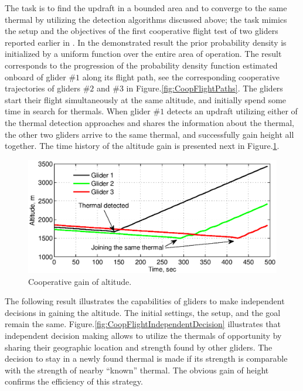\documentclass[letterpaper, 10 pt, conference]{ieeeconf}  %
\newcommand{\squeezeup}{\vspace{-1.0mm}}
\begin{document}
The task is to find the updraft in a bounded area and to converge to the same thermal by utilizing the detection algorithms discussed above; the task mimics the setup and the objectives of the first cooperative flight test of two gliders reported earlier in \cite{AKlass_JGCD:2012}. In the demonstrated
result the prior probability density is initialized by a uniform function over the entire area of operation. The result corresponds to the progression of the probability density function estimated onboard of glider $\#1$ along its flight path, see the corresponding cooperative trajectories of gliders
$\#2$ and $\#3$ in Figure.\ref{fig:CoopFlightPaths}. The gliders start their flight simultaneously at the same altitude, and initially spend some time in search for thermals. When glider $\#1$ detects an updraft utilizing either of the thermal detection approaches and shares the information about the thermal, the other two gliders arrive to the same thermal, and successfully gain height all together. The time history of the altitude gain is presented next in Figure.\ref{fig:CoopFlightHeight}.
\begin{figure}[thpb]
  \centering
  \includegraphics[scale=0.36]{Figures/Coop_gain_altitude.eps}
  \caption{Cooperative gain of altitude.}
  \label{fig:CoopFlightHeight}
\end{figure}
\squeezeup
The following result illustrates the capabilities of gliders to make independent decisions in gaining the altitude. The initial settings, the setup, and the goal remain the same. Figure.\ref{fig:CoopFlightIndependentDecision} illustrates that independent decision making allows to utilize the thermals of opportunity by sharing their geographic location and strength found by other gliders. The decision to stay in a newly found thermal is made if its strength is comparable with the strength of nearby ``known'' thermal. The obvious gain of height confirms the efficiency of this strategy.
\end{document}
